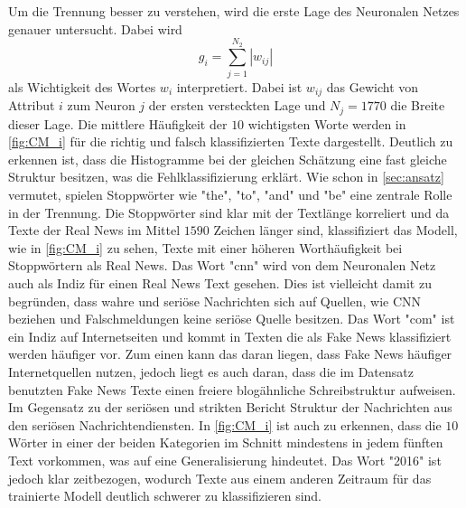 Um die Trennung besser zu verstehen, wird die erste Lage des Neuronalen Netzes genauer untersucht.
Dabei wird
\begin{equation}
    g_i = \sum_{j=1}^{N_2}|w_{ij}|
\end{equation}
als Wichtigkeit des Wortes $w_i$ interpretiert. Dabei ist $w_{ij}$ das Gewicht von Attribut $i$ zum Neuron $j$ der 
ersten versteckten Lage und $N_j=1770$ die Breite dieser Lage.
Die mittlere Häufigkeit der $10$ wichtigsten Worte werden in \autoref{fig:CM_i} für die richtig und falsch klassifizierten 
Texte dargestellt.
Deutlich zu erkennen ist, dass die Histogramme bei der gleichen Schätzung eine fast gleiche Struktur besitzen, was 
die Fehlklassifizierung erklärt.
Wie schon in \autoref{sec:ansatz} vermutet, spielen Stoppwörter wie "the", "to", "and" und "be" eine zentrale Rolle in der Trennung.
Die Stoppwörter sind klar mit der Textlänge korreliert und da Texte der Real News im Mittel $\num{1590}$ Zeichen 
länger sind, klassifiziert das Modell, wie in \autoref{fig:CM_i} zu sehen, Texte mit einer höheren Worthäufigkeit bei Stoppwörtern 
als Real News.
Das Wort "cnn" wird von dem Neuronalen Netz auch als Indiz für einen Real News Text gesehen.
Dies ist vielleicht damit zu begründen, dass wahre und seriöse Nachrichten sich auf Quellen, wie CNN beziehen und 
Falschmeldungen keine seriöse Quelle besitzen.
Das Wort "com" ist ein Indiz auf Internetseiten und kommt in Texten die als Fake News klassifiziert werden häufiger 
vor.
Zum einen kann das daran liegen, dass Fake News häufiger Internetquellen nutzen, jedoch liegt es auch daran, dass die 
im Datensatz benutzten Fake News Texte einen freiere blogähnliche Schreibstruktur aufweisen. 
Im Gegensatz zu der seriösen und strikten Bericht Struktur der Nachrichten aus den seriösen Nachrichtendiensten.
In \autoref{fig:CM_i} ist auch zu erkennen, dass die $10$ Wörter in einer der beiden Kategorien im Schnitt mindestens in 
jedem fünften Text vorkommen, was auf eine Generalisierung hindeutet.
Das Wort "2016" ist jedoch klar zeitbezogen, wodurch Texte aus einem anderen 
Zeitraum für das trainierte Modell deutlich schwerer zu klassifizieren sind. 

